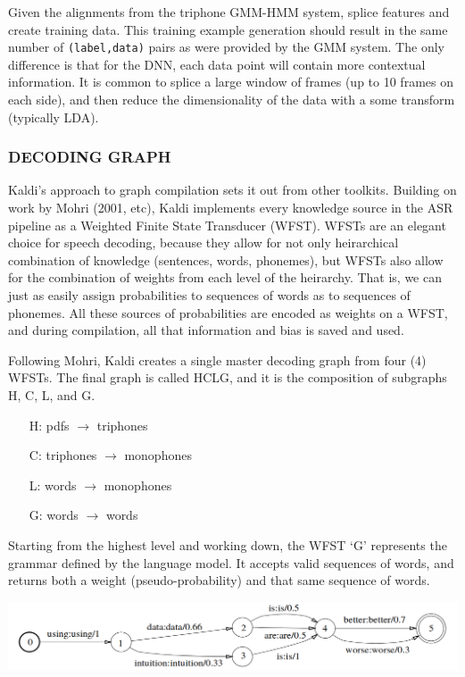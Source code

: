 \documentclass[10pt,a4paper]{article}
\begin{document}
Given the alignments from the triphone GMM-HMM system, splice features and create training data. This training example generation should result in the same number of \texttt{(label,data)} pairs as were provided by the GMM system. The only difference is that for the DNN, each data point will contain more contextual information. It is common to splice a large window of frames (up to 10 frames on each side), and then reduce the dimensionality of the data with a some transform (typically LDA).

    

\subsubsection{DECODING GRAPH}

Kaldi's approach to graph compilation sets it out from other toolkits. Building on work by Mohri (2001, etc), Kaldi implements every knowledge source in the ASR pipeline as a Weighted Finite State Transducer (WFST). WFSTs are an elegant choice for speech decoding, because they allow for not only heirarchical combination of knowledge (sentences, words, phonemes), but WFSTs also allow for the combination of weights from each level of the heirarchy. That is, we can just as easily assign probabilities to sequences of words as to sequences of phonemes. All these sources of probabilities are encoded as weights on a WFST, and during compilation, all that information and bias is saved and used.

Following Mohri, Kaldi creates a single master decoding graph from four (4) WFSTs. The final graph is called HCLG, and it is the composition of subgraphs H, C, L, and G.


\begin{enumerate}
\item[H:] pdfs $\rightarrow$ triphones
\item[C:] triphones $\rightarrow$ monophones
\item[L:] words $\rightarrow$ monophones
\item[G:] words $\rightarrow$ words
\end{enumerate}


Starting from the highest level and working down, the WFST `G' represents the grammar defined by the language model. It accepts valid sequences of words, and returns both a weight (pseudo-probability) and that same sequence of words.


\begin{center}
  \includegraphics[width=.9\textwidth,keepaspectratio]{figs/mohri-G.png}
\end{center}
\end{document}
